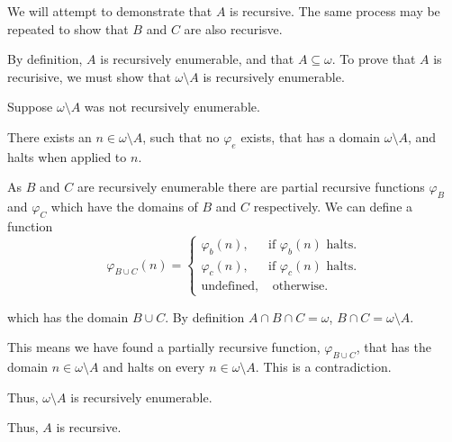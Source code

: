 \documentclass[a4paper]{article}
\begin{document}
We will attempt to demonstrate that $A$ is recursive. The same process may be repeated to show that $B$ and $C$ are also recurisve.

By definition, $A$ is recursively enumerable, and that $A \subseteq \omega$. To prove that $A$ is recurisive, we must show that  $\omega \setminus A$ is recursively enumerable.

    Suppose $\omega \setminus A$ was not recursively enumerable.

    There exists an $n \in \omega \setminus A$, such that no $\varphi_e$ exists, that has a domain $\omega \setminus A$, and halts when applied to $n$.

    As $B$ and $C$ are recursively enumerable there are partial recursive functions $\varphi_B$ and $\varphi_C$ which have the domains of $B$ and $C$ respectively. We can define a function 
    $$
    \varphi_{B \cup C}(n) = 
    \begin{cases}
        \varphi_b(n), &\mbox{if } \varphi_b(n) \text{ halts.}\\
        \varphi_c(n), &\mbox{if } \varphi_c(n) \text{ halts.}\\
        \text{undefined,} &\mbox{ otherwise.} 
    \end{cases} 
    $$

    which has the domain $B \cup C$. By definition $A \cap B \cap C = \omega$, $B \cap C = \omega \setminus A$.

    This means we have found a partially recursive function, $\varphi_{B \cup C}$, that has the domain $n \in \omega \setminus A$ and halts on every $n \in \omega \setminus A$. This is a contradiction.

    Thus, $\omega \setminus A$ is recursively enumerable.

    Thus, $A$ is recursive.
    
\end{document}
